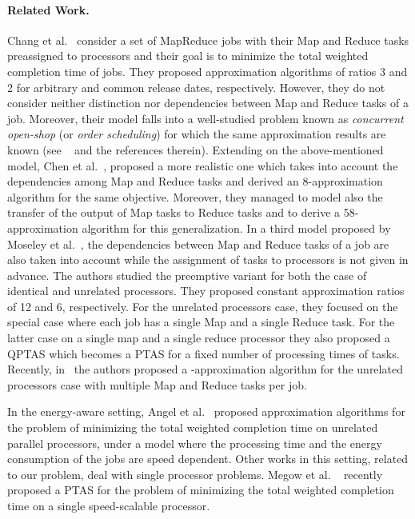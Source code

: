 \documentclass{llncs}
\begin{document}
\paragraph{Related Work.}
Chang et al.~\cite{ChangKKLLM11} consider a set of MapReduce jobs with their Map and Reduce tasks
preassigned to processors and their goal is to minimize the total weighted completion time of jobs.
They proposed approximation algorithms of ratios 3 and 2 for arbitrary and common release dates, respectively.
However, they do not consider neither distinction nor dependencies between Map and Reduce tasks of a job.
Moreover, their model  falls  into a well-studied problem known as  {\em concurrent open-shop}
(or {\em order scheduling}) for which the same approximation results are known  (see ~\cite{MastrolilliQSSU10} and the references therein).
Extending on the above-mentioned model, Chen et al.~\cite{ChenKL12},
proposed a more realistic one which takes into account the dependencies among Map and Reduce tasks  and derived  an 8-approximation algorithm for the same objective.
Moreover, they managed to model  also the  transfer of the output of Map tasks to Reduce tasks and to derive  a  58-approximation algorithm for this generalization.
In a third model proposed by Moseley et al.~\cite{MoseleyDKS11}, the dependencies between Map and Reduce tasks of a job are also  taken into account while the assignment of tasks to processors is not given in advance.
The authors studied the preemptive variant for both the case of identical and unrelated processors. They proposed constant approximation ratios of 12 and 6, respectively.
For the unrelated processors case, they focused on the special case where each job has a single Map and a single Reduce task.
For the latter case on a single map and a single reduce processor they also proposed a QPTAS which becomes a PTAS for a fixed number of processing times of tasks. Recently, in~\cite{FotakisMZZ13} the authors proposed a -approximation algorithm for the unrelated processors case with multiple Map and Reduce tasks per job.

In the energy-aware setting, Angel et al.~\cite{AngelBK12}
proposed approximation algorithms for the problem of minimizing
the total weighted completion time on unrelated parallel
processors, under a model where the processing time and the energy
consumption of the jobs are speed dependent. Other works in this setting,
related to our problem, deal with single processor problems.
Megow et al. ~\cite{MegowV12} recently proposed a PTAS for the problem of minimizing the total weighted completion time on a single speed-scalable processor.
\end{document}
